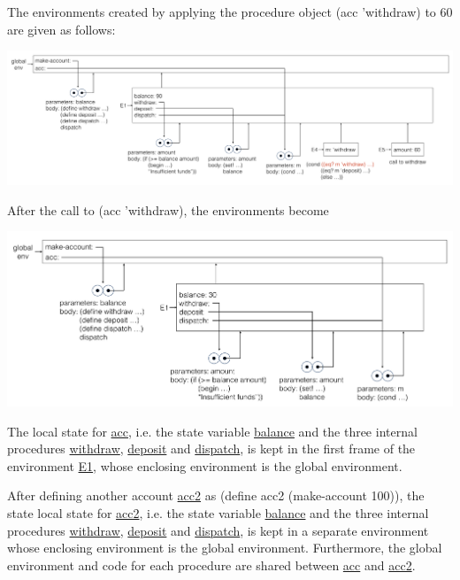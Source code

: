\documentclass[11pt, oneside]{article}
\begin{document}
The environments created by applying the procedure object (acc 'withdraw) to 60 are given as follows:

\begin{center}
    \includegraphics[width=15cm]{ex-3.11-4.png}
\end{center}

After the call to (acc 'withdraw), the environments become

\begin{center}
    \includegraphics[width=15cm]{ex-3.11-5.png}
\end{center}

The local state for \url{acc}, i.e. the state variable \url{balance} and the three internal procedures \url{withdraw}, \url{deposit} and \url{dispatch}, is kept in the first frame of the environment \url{E1}, whose enclosing environment is the global environment.

After defining another account \url{acc2} as (define acc2 (make-account 100)), the state local state for \url{acc2}, i.e. the state variable \url{balance} and the three internal procedures \url{withdraw}, \url{deposit} and \url{dispatch}, is kept in a separate environment whose enclosing environment is the global environment. Furthermore, the global environment and code for each procedure are shared between \url{acc} and \url{acc2}.
\end{document}
